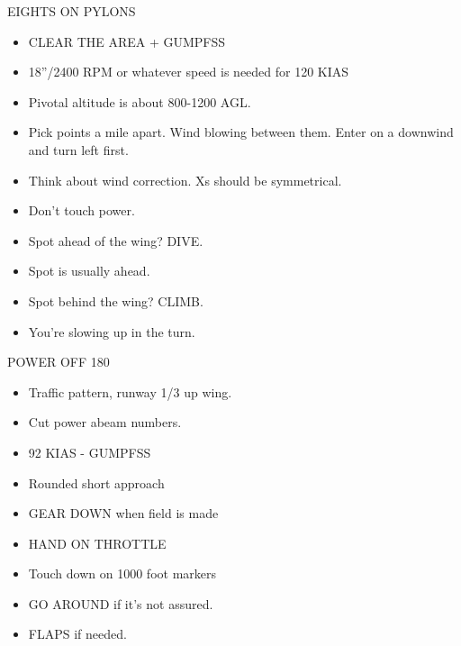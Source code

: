 EIGHTS ON PYLONS
\begin{itemize}
    \item CLEAR THE AREA + GUMPFSS
    \item 18”/2400 RPM or whatever speed is needed for 120 KIAS
    \item Pivotal altitude is about 800-1200 AGL.
    \item Pick points a mile apart. Wind blowing between them. Enter on a downwind and turn left first.
    \item Think about wind correction. Xs should be symmetrical.
    \item Don’t touch power.
    \item Spot ahead of the wing? DIVE.
    \item Spot is usually ahead.
    \item Spot behind the wing? CLIMB.
    \item You’re slowing up in the turn.
\end{itemize}

POWER OFF 180
\begin{itemize}
    \item Traffic pattern, runway 1/3 up wing.
    \item Cut power abeam numbers.
    \item 92 KIAS - GUMPFSS
    \item Rounded short approach
    \item GEAR DOWN when field is made
    \item HAND ON THROTTLE
    \item Touch down on 1000 foot markers
    \item GO AROUND if it’s not assured.
    \item FLAPS if needed.
\end{itemize}


